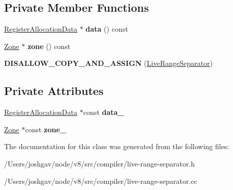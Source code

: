 \subsection*{Private Member Functions}
\begin{DoxyCompactItemize}
\item 
\hyperlink{classv8_1_1internal_1_1compiler_1_1_register_allocation_data}{Register\+Allocation\+Data} $\ast$ {\bfseries data} () const \hypertarget{classv8_1_1internal_1_1compiler_1_1_live_range_separator_a2e4c9169f0e62eef2170604fe47c5838}{}\label{classv8_1_1internal_1_1compiler_1_1_live_range_separator_a2e4c9169f0e62eef2170604fe47c5838}

\item 
\hyperlink{classv8_1_1internal_1_1_zone}{Zone} $\ast$ {\bfseries zone} () const \hypertarget{classv8_1_1internal_1_1compiler_1_1_live_range_separator_a9a2bb1f35998720115ae9cc5eefc6b58}{}\label{classv8_1_1internal_1_1compiler_1_1_live_range_separator_a9a2bb1f35998720115ae9cc5eefc6b58}

\item 
{\bfseries D\+I\+S\+A\+L\+L\+O\+W\+\_\+\+C\+O\+P\+Y\+\_\+\+A\+N\+D\+\_\+\+A\+S\+S\+I\+GN} (\hyperlink{classv8_1_1internal_1_1compiler_1_1_live_range_separator}{Live\+Range\+Separator})\hypertarget{classv8_1_1internal_1_1compiler_1_1_live_range_separator_a584ec9b22ccbc9e7067f1629c21d7a80}{}\label{classv8_1_1internal_1_1compiler_1_1_live_range_separator_a584ec9b22ccbc9e7067f1629c21d7a80}

\end{DoxyCompactItemize}
\subsection*{Private Attributes}
\begin{DoxyCompactItemize}
\item 
\hyperlink{classv8_1_1internal_1_1compiler_1_1_register_allocation_data}{Register\+Allocation\+Data} $\ast$const {\bfseries data\+\_\+}\hypertarget{classv8_1_1internal_1_1compiler_1_1_live_range_separator_acde17976bc6ad0aea61000c57004ae18}{}\label{classv8_1_1internal_1_1compiler_1_1_live_range_separator_acde17976bc6ad0aea61000c57004ae18}

\item 
\hyperlink{classv8_1_1internal_1_1_zone}{Zone} $\ast$const {\bfseries zone\+\_\+}\hypertarget{classv8_1_1internal_1_1compiler_1_1_live_range_separator_a3a1a692f8950e7e2dc707dadb25bc345}{}\label{classv8_1_1internal_1_1compiler_1_1_live_range_separator_a3a1a692f8950e7e2dc707dadb25bc345}

\end{DoxyCompactItemize}


The documentation for this class was generated from the following files\+:\begin{DoxyCompactItemize}
\item 
/\+Users/joshgav/node/v8/src/compiler/live-\/range-\/separator.\+h\item 
/\+Users/joshgav/node/v8/src/compiler/live-\/range-\/separator.\+cc\end{DoxyCompactItemize}
